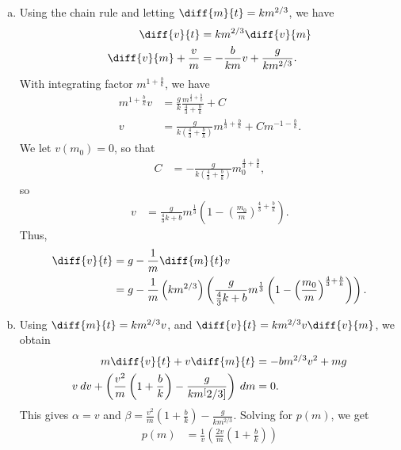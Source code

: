 \documentclass[10pt]{mypackage}
\begin{document}
\begin{solution}[38.6]\hfill
  \begin{enumerate}[(a)]
    \item Using the chain rule and letting $\diff{m}{t} = km^{2/3}$, we have
      \begin{align*}
        \diff{v}{t} &= km^{2/3}\diff{v}{m}\\
        \diff{v}{m} + \frac{v}{m} &= -\frac{b}{km}v + \frac{g}{km^{2/3}}.
      \end{align*}
      With integrating factor $m^{1 + \frac{b}{k}}$, we have
      \begin{align*}
        m^{1 + \frac{b}{k}}v &= \frac{g}{k}\frac{m^{\frac{4}{3} + \frac{b}{k}}}{\frac{4}{3} + \frac{b}{k}} + C\\
        v &= \frac{g}{k\left( \frac{4}{3} + \frac{b}{k} \right)}m^{\frac{1}{3} + \frac{b}{k}} + Cm^{-1-\frac{b}{k}}.
      \end{align*}
      We let $v\left( m_0 \right)= 0$, so that
      \begin{align*}
        C &= -\frac{g}{k\left( \frac{4}{3} + \frac{b}{k} \right)}m_0^{\frac{4}{3} + \frac{b}{k}},
      \end{align*}
      so
      \begin{align*}
        v &= \frac{g}{\frac{4}{3}k + b}m^{\frac{1}{3}}\left( 1-\left( \frac{m_0}{m} \right)^{\frac{4}{3} + \frac{b}{k}} \right).
      \end{align*}
      Thus,
      \begin{align*}
        \diff{v}{t} &= g - \frac{1}{m}\diff{m}{t} v\\
                    &= g- \frac{1}{m}\left( km^{2/3} \right)\left(\frac{g}{\frac{4}{3}k + b}m^{\frac{1}{3}}\left( 1-\left( \frac{m_0}{m} \right)^{\frac{4}{3} + \frac{b}{k}} \right)  \right).
      \end{align*}
    \item Using $\diff{m}{t} = km^{2/3}v$, and $\diff{v}{t} = km^{2/3}v\diff{v}{m}$, we obtain
      \begin{align*}
        m\diff{v}{t} + v\diff{m}{t} &= -bm^{2/3}v^{2} + mg\\
        v\:dv + \left( \frac{v^2}{m}\left( 1 + \frac{b}{k} \right) - \frac{g}{km^[2/3]} \right)\:dm &= 0.
      \end{align*}
      This gives $\alpha = v$ and $\beta = \frac{v^2}{m}\left( 1 + \frac{b}{k} \right)- \frac{g}{km^{2/3}}$. Solving for $p(m)$, we get
      \begin{align*}
        p(m) &= \frac{1}{v}\left( \frac{2v}{m}\left( 1 + \frac{b}{k} \right) \right)\\

\end{align*}
\end{enumerate}
\end{solution}
\end{document}

